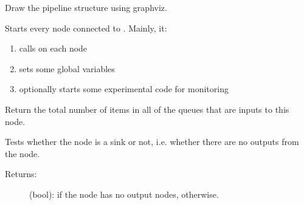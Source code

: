 \documentclass[letterpaper,10pt,english]{sphinxmanual}
\begin{document}
\begin{fulllineitems}
\begin{fulllineitems}
\end{fulllineitems}


\begin{fulllineitems}
\label{\detokenize{api:nanostream.node.NanoNode.draw_pipeline}}
Draw the pipeline structure using graphviz.

\end{fulllineitems}


\begin{fulllineitems}
\label{\detokenize{api:nanostream.node.NanoNode.global_start}}
Starts every node connected to . Mainly, it:
\begin{enumerate}
\def\theenumi{\arabic{enumi}}
\def\labelenumi{\theenumi .}
\makeatletter\def\p@enumii{\p@enumi \theenumi .}\makeatother
\item {} 
calls  on each node

\item {} 
sets some global variables

\item {} 
optionally starts some experimental code for monitoring

\end{enumerate}

\end{fulllineitems}


\begin{fulllineitems}
\label{\detokenize{api:nanostream.node.NanoNode.input_queue_size}}
Return the total number of items in all of the queues that are inputs
to this node.

\end{fulllineitems}


\begin{fulllineitems}
\label{\detokenize{api:nanostream.node.NanoNode.is_sink}}
Tests whether the node is a sink or not, i.e. whether there are no
outputs from the node.
\begin{description}
\item[{Returns:}] \leavevmode
(bool):  if the node has no output nodes,  otherwise.


\end{description}
\end{fulllineitems}
\end{fulllineitems}
\end{document}
